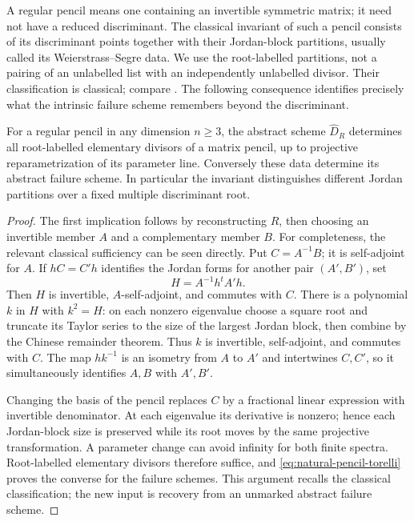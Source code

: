 A regular pencil means one containing an invertible symmetric matrix;
it need not have a reduced discriminant.  The classical invariant of
such a pencil consists of its discriminant points together with their
Jordan-block partitions, usually called its Weierstrass--Segre data.
We use the root-labelled partitions, not a pairing of an unlabelled
list with an independently unlabelled divisor.  Their classification
is classical; compare \cite[Theorem~1.1, Corollary~2.1 and \S2]{FevolaMandelshtamSturmfels}.
The following consequence identifies precisely what the intrinsic
failure scheme remembers beyond the discriminant.

\begin{corollary}
\label{cor:intrinsic-segre-data}
For a regular pencil in any dimension \(n\ge3\), the abstract
scheme \(\widehat D_R\) determines all root-labelled elementary
divisors of a matrix pencil, up to projective reparametrization of its
parameter line.  Conversely these data determine its abstract failure
scheme.  In particular the invariant distinguishes different Jordan
partitions over a fixed multiple discriminant root.
\end{corollary}
\begin{proof}
The first implication follows by reconstructing \(R\), then
choosing an invertible member \(A\) and a complementary member
\(B\).  For completeness, the relevant classical sufficiency can
be seen directly.  Put \(C=A^{-1}B\); it is self-adjoint for
\(A\).  If \(hC=C'h\) identifies the Jordan forms for another
pair \((A',B')\), set
\[
 H=A^{-1}h^tA'h.
\]
Then \(H\) is invertible, \(A\)-self-adjoint, and commutes with
\(C\).  There is a polynomial \(k\) in \(H\) with
\(k^2=H\): on each nonzero eigenvalue choose a square root and
truncate its Taylor series to the size of the largest Jordan block,
then combine by the Chinese remainder theorem.  Thus \(k\) is
invertible, self-adjoint, and commutes with \(C\).
The map \(hk^{-1}\) is an isometry from \(A\) to \(A'\)
and intertwines \(C,C'\), so it simultaneously identifies
\(A,B\) with \(A',B'\).

Changing the basis of the pencil replaces \(C\) by a fractional
linear expression with invertible denominator.  At each eigenvalue
its derivative is nonzero; hence each Jordan-block size is preserved
while its root moves by the same projective transformation.  A
parameter change can avoid infinity for both finite spectra.
Root-labelled elementary divisors therefore suffice, and
\eqref{eq:natural-pencil-torelli} proves the converse for the
failure schemes.  This argument recalls the classical classification;
the new input is recovery from an unmarked abstract failure scheme.
\end{proof}

